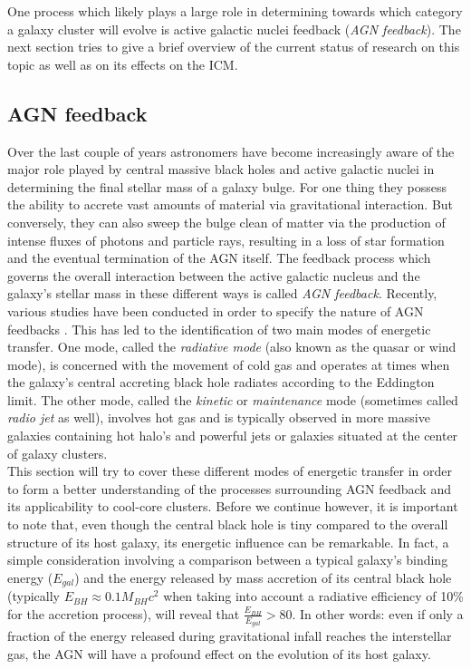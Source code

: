 \documentclass[a4paper]{article}
\begin{document}
        One process which likely plays a large role in determining towards which category a galaxy cluster will evolve is active galactic nuclei feedback (\textit{AGN feedback}). The next section tries to give a brief overview of the current status of research on this topic as well as on its effects on the ICM.
    
    
    
    \subsection{AGN feedback}
        Over the last couple of years astronomers have become increasingly aware of the major role played by central massive black holes and active galactic nuclei in determining the final stellar mass of a galaxy bulge. For one thing they possess the ability to accrete vast amounts of material via gravitational interaction. But conversely, they can also sweep the bulge clean of matter via the production of intense fluxes of photons and particle rays, resulting in a loss of star formation and the eventual termination of the AGN itself. The feedback process which governs the overall interaction between the active galactic nucleus and the galaxy's stellar mass in these different ways is called \textit{AGN feedback}. Recently, various studies have been conducted in order to specify the nature of AGN feedbacks\citep{Fabian2012, McNamara2012} . This has led to the identification of two main modes of energetic transfer. One mode, called the \textit{radiative mode} (also known as the quasar or wind mode), is concerned with the movement of cold gas and operates at times when the galaxy's central accreting black hole radiates according to the Eddington limit. The other mode, called the \textit{kinetic} or \textit{maintenance} mode (sometimes called \textit{radio jet} as well), involves hot gas and is typically observed in more massive galaxies containing hot halo's and powerful jets or galaxies situated at the center of galaxy clusters. \\
        This section will try to cover these different modes of energetic transfer in order to form a better understanding of the processes surrounding AGN feedback and its applicability to cool-core clusters. Before we continue however, it is important to note that, even though the central black hole is tiny compared to the overall structure of its host galaxy, its energetic influence can be remarkable. In fact, a simple consideration involving a comparison between a typical galaxy's binding energy ($E_{gal}$) and the energy released by mass accretion of its central black hole (typically $E_{BH} \approx 0.1 M_{BH} c^2$ when taking into account a radiative efficiency of 10\% for the accretion process), will reveal that $\frac{E_{BH}}{E_{gal}} > 80$. In other words: even if only a fraction of the energy released during gravitational infall reaches the interstellar gas, the AGN will have a profound effect on the evolution of its host galaxy.
        
\end{document}
